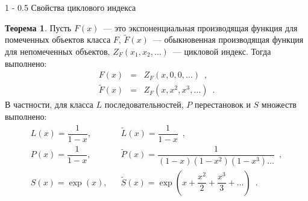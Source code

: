 \documentclass[a5paper]{article}
\makeatletter
\theoremstyle{definition}
\newtheorem*{theorem}{Теорема}
\renewcommand{\subsection}{\@startsection
{subsection}%
{1}%
{\z@}%
{-\baselineskip}%
{0.5\baselineskip}%
{\centering\large\scshape}} %
\makeatother
\begin{document}
\subsection{Свойства циклового индекса}

\begin{theorem}
Пусть \( F(x) \)~--- это экспоненциальная производящая функция для помеченных
объектов класса \( F \), \( \widetilde F(x) \)~--- обыкновенная производящая
функция для непомеченных объектов, \( Z_F(x_1, x_2, \ldots) \)~--- цикловой
индекс. Тогда выполнено:
\begin{eqnarray*}
    F(x) &=&  Z_F(x, 0, 0, \ldots) \enspace , \\ 
    \widetilde F(x) &=& Z_F(x, x^2, x^3, \ldots) \enspace . 
\end{eqnarray*}
В частности, для класса \( L \) последовательностей, \( P \) перестановок и \( S
\) множеств выполнено:
\begin{eqnarray*}
    L(x) = \dfrac{1}{1 - x}, && \widetilde L(x) = \dfrac{1}{1-x}\enspace  , \\
    P(x) = \dfrac{1}{1 - x}, && \widetilde P(x) = \dfrac{1}{(1-x)(1 - x^2)(1 -
x^3) \ldots} \enspace , \\
    S(x) = \exp(x), &  &
\widetilde S(x) = \exp\left( x + \dfrac{x^2}{2} + \dfrac{x^3}{3} + \ldots
\right) \enspace .
\end{eqnarray*}
\end{theorem}
\end{document}
